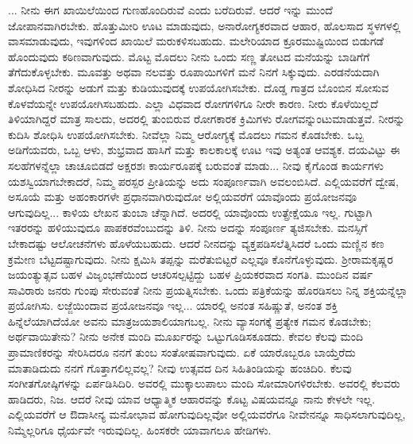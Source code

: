 ... ನೀನು ಈಗ ಖಾಯಿಲೆಯಿಂದ ಗುಣಹೊಂದಿರುವೆ ಎಂದು ಬರೆದಿರುವೆ. ಆದರೆ ಇನ್ನು ಮುಂದೆ ಜೋಪಾನವಾಗಿರಬೇಕು. ಹೊತ್ತುಮೀರಿ ಊಟ ಮಾಡುವುದು, ಅನಾರೋಗ್ಯಕರವಾದ ಆಹಾರ, ಹೊಲಸಾದ ಸ್ಥಳಗಳಲ್ಲಿ ವಾಸಮಾಡುವುದು, ಇವುಗಳಿಂದ ಖಾಯಿಲೆ ಮರುಕಳಿಸಬಹುದು. ಮಲೇರಿಯಾದ ಕ್ರೂರಮುಷ್ಟಿಯಿಂದ ಬಿಡುಗಡೆ ಹೊಂದುವುದು ಕಠಿಣವಾಗುವುದು. ಮೊಟ್ಟ ಮೊದಲು ನೀನು ಒಂದು ಸಣ್ಣ ತೋಟದ ಮನೆಯನ್ನು ಬಾಡಿಗೆಗೆ ತೆಗೆದುಕೊಳ್ಳಬೇಕು. ಮೂವತ್ತು ಅಥವಾ ನಲವತ್ತು ರೂಪಾಯಿಗಳಿಗೆ ಮನೆ ನಿನಗೆ ಸಿಕ್ಕುವುದು. ಎರಡನೆಯದಾಗಿ ಶೋಧಿಸಿದ ನೀರನ್ನು ಅಡುಗೆ ಮತ್ತು ಕುಡಿಯುವುದಕ್ಕೆ ಉಪಯೋಗಿಸಬೇಕು. ದೊಡ್ಡ ಗಾತ್ರದ ಬೊಂಬಿನ ಸೋಸುವ ಕೊಳವೆಯನ್ನೇ ಉಪಯೋಗಿಸಬಹುದು. ಎಲ್ಲಾ ವಿಧವಾದ ರೋಗಗಳಿಗೂ ನೀರೇ ಕಾರಣ. ನೀರು ಕೊಳೆಯಿಲ್ಲದೆ ತಿಳಿಯಾಗಿದ್ದರೆ ಮಾತ್ರ ಸಾಲದು, ಅದರಲ್ಲಿ ತುಂಬಿರುವ ರೋಗಕಾರಕ ಕ್ರಿಮಿಗಳು ರೋಗವನ್ನುಂಟುಮಾಡುತ್ತವೆ. ನೀರನ್ನು ಕುದಿಸಿ ಶೋಧಿಸಿ ಉಪಯೋಗಿಸಬೇಕು. ನೀವೆಲ್ಲಾ ನಿಮ್ಮ ಆರೋಗ್ಯಕ್ಕೆ ಮೊದಲು ಗಮನ ಕೊಡಬೇಕು. ಒಬ್ಬ ಅಡಿಗೆಯವರು, ಒಬ್ಬ ಆಳು, ಶುಭ್ರವಾದ ಹಾಸಿಗೆ ಮತ್ತು ಕಾಲಕಾಲಕ್ಕೆ ಊಟ ಇವು ಅತ್ಯಂತ ಆವಶ್ಯಕ. ದಯವಿಟ್ಟು ಈ ಸಲಹೆಗಳನ್ನೆಲ್ಲಾ ಚಾಚೂಬಿಡದೆ ಅಕ್ಷರಶಃ ಕಾರ್ಯರೂಪಕ್ಕೆ ಬರುವಂತೆ ಮಾಡು... ನೀವು ಕೈಗೊಂಡ ಕಾರ್ಯಗಳು ಯಶಸ್ವಿಯಾಗಬೇಕಾದರೆ, ನಿಮ್ಮ ಪರಸ್ಪರ ಪ್ರೀತಿಯನ್ನು ಅದು ಸಂಪೂರ್ಣವಾಗಿ ಅವಲಂಬಿಸಿದೆ. ಎಲ್ಲಿಯವರೆಗೆ ದ್ವೇಷ, ಅಸೂಯೆ ಮತ್ತು ಅಹಂಕಾರಗಳೇ ಪ್ರಧಾನವಾಗಿರುವುದೋ ಅಲ್ಲಿಯವರೆಗೆ ಯಾವೊಂದು ಪ್ರಯೋಜನವೂ ಆಗುವುದಿಲ್ಲ... ಕಾಳಿಯ ಲೇಖನ ತುಂಬಾ ಚೆನ್ನಾಗಿದೆ. ಅದರಲ್ಲಿ ಯಾವೊಂದು ಉತ್ಪ್ರೇಕ್ಷೆಯೂ ಇಲ್ಲ. ಗುಟ್ಟಾಗಿ ಇತರರನ್ನು ಹಳಿಯುವುದೂ ಪಾಪಕರವೆಂಬುದನ್ನು ತಿಳಿ. ನೀನು ಅದನ್ನು ಸಂಪೂರ್ಣ ತ್ಯಜಿಸಬೇಕು. ಮನಸ್ಸಿಗೆ ಬೇಕಾದಷ್ಟು ಆಲೋಚನೆಗಳು ಹೊಳೆಯಬಹುದು. ಆದರೆ ನೀನದನ್ನು ವ್ಯಕ್ತಪಡಿಸಲೆತ್ನಿಸಿದರೆ ಒಂದು ಮಣ್ಣಿನ ಕಣ ಕ್ರಮೇಣ ಬೆಟ್ಟದಷ್ಟಾಗುವುದು. ನೀನು ಕ್ಷಮಿಸಿ ತಪ್ಪನ್ನು ಮರೆತುಬಿಟ್ಟರೆ ಎಲ್ಲವೂ ಕೊನೆಗೊಳ್ಳುವುದು. ಶ‍್ರೀರಾಮಕೃಷ್ಣರ ಜಯಂತ್ಯುತ್ಸವ ಬಹಳ ವಿಜೃಂಭಣೆಯಿಂದ ಆಚರಿಸಲ್ಪಟ್ಟಿದ್ದು ಬಹಳ ಪ್ರಿಯಕರವಾದ ಸಂಗತಿ. ಮುಂದಿನ ವರ್ಷ ಸಾವಿರಾರು ಜನರು ಗುಂಪು ಸೇರುವಂತೆ ನೀನು ಪ್ರಯತ್ನಿಸಬೇಕು. ಒಂದು ಪತ್ರಿಕೆಯನ್ನು ಹೊರಡಿಸಲು ನಿನ್ನ ಶಕ್ತಿಯನ್ನೆಲ್ಲಾ ಪ್ರಯೋಗಿಸು. ಲಜ್ಜೆಯಿಂದಾವ ಪ್ರಯೋಜನವೂ ಇಲ್ಲ... ಯಾರಲ್ಲಿ ಅನಂತ ಸಹಿಷ್ಣುತೆ, ಅನಂತ ಶಕ್ತಿ ಹಿನ್ನೆಲೆಯಾಗಿದೆಯೋ ಅವನು ಮಾತ್ರ\break ಜಯಶಾಲಿಯಾಗಬಲ್ಲ. ನೀನು ವ್ಯಾಸಂಗಕ್ಕೆ ಪ್ರತ್ಯೇಕ ಗಮನ ಕೊಡಬೇಕು; ಅರ್ಥವಾಯಿ\break ತೇನು? ನೀನು ಅನೇಕ ಮಂದಿ ಮೂರ್ಖರನ್ನು ಒಟ್ಟುಗೂಡಿಸಕೂಡದು. ಕೇವಲ ಕೆಲವು ಮಂದಿ ಪ್ರಾಮಾಣಿಕರನ್ನು ಸೇರಿಸಿದರೂ ನನಗೆ ತುಂಬ ಸಂತೋಷವಾಗುವುದು. ಏಕೆ ಯಾರೊಬ್ಬರೂ ಬಾಯ್ತೆರೆದು ಮಾತಾಡಿದುದು ನನಗೆ ಗೊತ್ತಾಗಲಿಲ್ಲವಲ್ಲ? ನೀವು ಉತ್ಸವದ ದಿನ ಸಿಹಿತಿಂಡಿಯನ್ನು ಹಂಚಿದಿರಿ. ಕೆಲವು ಸಂಗೀತಗೋಷ್ಠಿಗಳನ್ನು ಏರ್ಪಡಿಸಿದಿರಿ. ಅವರಲ್ಲಿ ಮುಕ್ಕಾಲುಪಾಲು ಮಂದಿ ಸೋಮಾರಿಗಳಿರಬೇಕು. ಅವರಲ್ಲಿ ಕೆಲವರು ಹಾಡಿದರು, ನಿಜ. ಆದರೆ ನೀವು ಯಾವ ಆಧ್ಯಾತ್ಮಿಕ ಆಹಾರವನ್ನು ಕೊಟ್ಟ ವಿಷಯವನ್ನೂ ನಾನು ಕೇಳಲೇ ಇಲ್ಲ. ಎಲ್ಲಿಯವರೆಗೆ ಆ ಔದಾಸೀನ್ಯ ಮನೋಭಾವ ಹೋಗುವುದಿಲ್ಲವೋ ಅಲ್ಲಿಯವರೆಗೂ ನೀವೇನನ್ನೂ ಸಾಧಿಸಲಾಗುವುದಿಲ್ಲ, ನಿಮ್ಮೆಲ್ಲರಿಗೂ ಧೈರ್ಯವೇ ಇರುವುದಿಲ್ಲ. ಹಿಂಸಕರೇ ಯಾವಾಗಲೂ ಹೇಡಿಗಳು.


